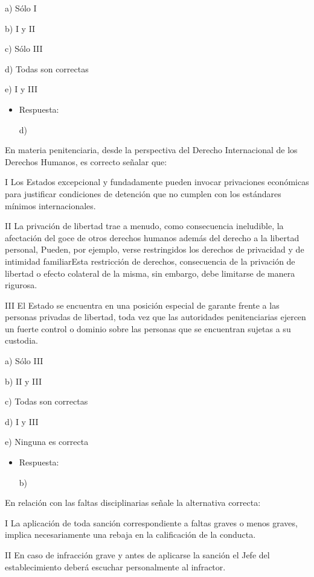 \documentclass[letterpaper, 11pt]{article}
\begin{document}
a) Sólo I

b) I y II

c) Sólo III

d) Todas son correctas

e) I y III

\begin{itemize}
\item Respuesta:

d)
\end{itemize}


En materia penitenciaria, desde la perspectiva del Derecho
Internacional de los Derechos Humanos, es correcto señalar que:

I Los Estados excepcional y fundadamente pueden invocar privaciones
económicas para justificar condiciones de detención que no cumplen con
los estándares mínimos internacionales.

II La privación de libertad trae a menudo, como consecuencia
ineludible, la afectación del goce de otros derechos humanos además
del derecho a la libertad personal, Pueden, por ejemplo, verse
restringidos los derechos de privacidad y de intimidad familiarEsta
restricción de derechos, consecuencia de la privación de libertad o
efecto colateral de la misma, sin embargo, debe limitarse de manera
rigurosa.

III El Estado se encuentra en una posición especial de garante frente
a las personas privadas de libertad, toda vez que las autoridades
penitenciarias ejercen un fuerte control o dominio sobre las personas
que se encuentran sujetas a su custodia.


a) Sólo III

b) II y III

c) Todas son correctas

d) I y III

e) Ninguna es correcta

\begin{itemize}
\item Respuesta:

b)
\end{itemize}


En relación con las faltas disciplinarias señale la alternativa
correcta:

I La aplicación de toda sanción correspondiente a faltas graves o
menos graves, implica necesariamente una rebaja en la calificación de
la conducta.

II En caso de infracción grave y antes de aplicarse la sanción el Jefe
del establecimiento deberá escuchar personalmente al infractor.
\end{document}
